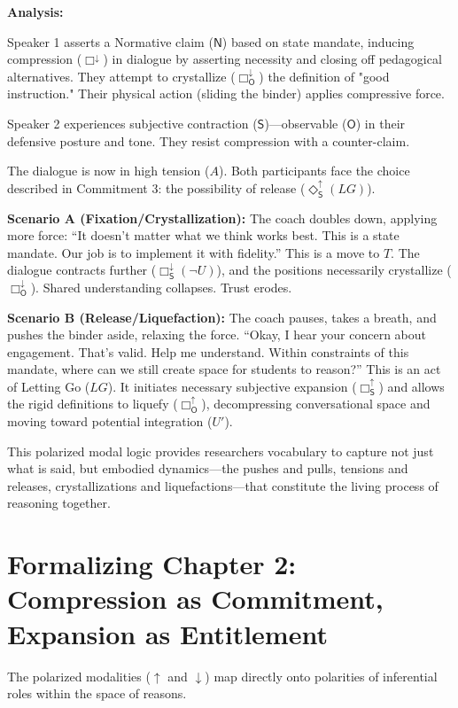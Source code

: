 \documentclass[12pt]{book}
\newcommand{\SBoxUp}{\Box_{\mathsf{S}}^{\uparrow}}
\newcommand{\SBoxDown}{\Box_{\mathsf{S}}^{\downarrow}}
\newcommand{\SDiaUp}{\Diamond_{\mathsf{S}}^{\uparrow}}
\newcommand{\OBoxUp}{\Box_{\mathsf{O}}^{\uparrow}}
\newcommand{\OBoxDown}{\Box_{\mathsf{O}}^{\downarrow}}
\begin{document}
\textbf{Analysis:}

Speaker 1 asserts a Normative claim ($\mathsf{N}$) based on state mandate, inducing compression ($\Box^{\downarrow}$) in dialogue by asserting necessity and closing off pedagogical alternatives. They attempt to crystallize ($\OBoxDown$) the definition of "good instruction." Their physical action (sliding the binder) applies compressive force.

Speaker 2 experiences subjective contraction ($\mathsf{S}$)---observable ($\mathsf{O}$) in their defensive posture and tone. They resist compression with a counter-claim.

The dialogue is now in high tension ($A$). Both participants face the choice described in Commitment 3: the possibility of release ($\SDiaUp(LG)$).

\textbf{Scenario A (Fixation/Crystallization):} The coach doubles down, applying more force: ``It doesn't matter what we think works best. This is a state mandate. Our job is to implement it with fidelity.'' This is a move to $T$. The dialogue contracts further ($\SBoxDown(\neg U)$), and the positions necessarily crystallize ($\OBoxDown$). Shared understanding collapses. Trust erodes.

\textbf{Scenario B (Release/Liquefaction):} The coach pauses, takes a breath, and pushes the binder aside, relaxing the force. ``Okay, I hear your concern about engagement. That's valid. Help me understand. Within constraints of this mandate, where can we still create space for students to reason?'' This is an act of Letting Go ($LG$). It initiates necessary subjective expansion ($\SBoxUp$) and allows the rigid definitions to liquefy ($\OBoxUp$), decompressing conversational space and moving toward potential integration ($U'$).

This polarized modal logic provides researchers vocabulary to capture not just what is said, but embodied dynamics---the pushes and pulls, tensions and releases, crystallizations and liquefactions---that constitute the living process of reasoning together.

\section{Formalizing Chapter 2: Compression as Commitment, Expansion as Entitlement}

The polarized modalities ($\uparrow$ and $\downarrow$) map directly onto polarities of inferential roles within the space of reasons.
\end{document}

